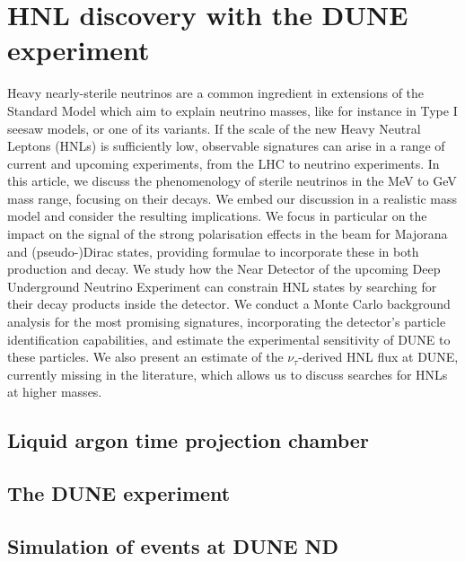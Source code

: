 \clearpage
\chapter{HNL discovery with the DUNE experiment}

Heavy nearly-sterile neutrinos are a common ingredient in extensions of the
Standard Model which aim to explain neutrino masses, like for instance in Type I
seesaw models, or one of its variants. If the scale of the new Heavy Neutral Leptons (HNLs) is sufficiently low, 
observable signatures can arise in a range of current and upcoming experiments, from the LHC to neutrino experiments.
%
In this article, we discuss the phenomenology of sterile neutrinos in the MeV to GeV mass range, focusing on their decays. We embed our discussion in a realistic mass model and consider the resulting implications.
%
We focus in particular on the impact on the signal of the strong polarisation
effects in the beam for Majorana and \mbox{(pseudo-)Dirac} states, providing formulae 
to incorporate these in both production and decay.
%
We study how the Near Detector of the upcoming Deep Underground Neutrino
Experiment can constrain HNL states by searching for their decay products inside the detector.
%
We conduct a Monte Carlo background analysis for the most promising
signatures, incorporating the detector's particle identification capabilities,
and estimate the experimental sensitivity of DUNE to these particles.  
%
We also present an estimate of the \mbox{$\nu_\tau$-derived} HNL flux at DUNE, 
currently missing in the literature, which allows us to discuss searches for 
HNLs at higher masses.  
%
 
\section{Liquid argon time projection chamber}

\section{The DUNE experiment}

\section{Simulation of events at DUNE ND}
\label{sec:experiment}

